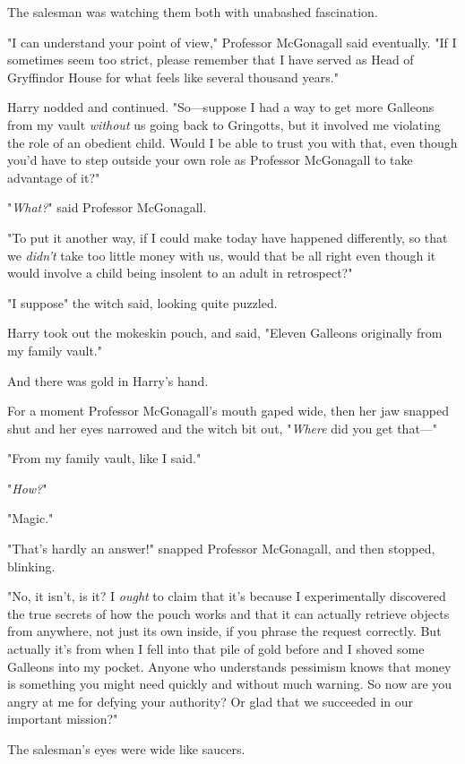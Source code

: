The salesman was watching them both with unabashed fascination.

"I can understand your point of view," Professor McGonagall said eventually.
"If I sometimes seem too strict, please remember that I have served as Head of
Gryffindor House for what feels like several thousand years."

Harry nodded and continued. "So—suppose I had a way to get more Galleons from
my vault \emph{without} us going back to Gringotts, but it involved me
violating the role of an obedient child. Would I be able to trust you with
that, even though you'd have to step outside your own role as Professor
McGonagall to take advantage of it?"

"\emph{What?}" said Professor McGonagall.

"To put it another way, if I could make today have happened differently, so
that we \emph{didn't} take too little money with us, would that be all right
even though it would involve a child being insolent to an adult in retrospect?"

"I{\el} suppose{\el}" the witch said, looking quite puzzled.

Harry took out the mokeskin pouch, and said, "Eleven Galleons originally from
my family vault."

And there was gold in Harry's hand.

For a moment Professor McGonagall's mouth gaped wide, then her jaw snapped shut
and her eyes narrowed and the witch bit out, "\emph{Where} did you get that—"

"From my family vault, like I said."

"\emph{How?}"

"Magic."

"That's hardly an answer!" snapped Professor McGonagall, and then stopped,
blinking.

"No, it isn't, is it? I \emph{ought} to claim that it's because I
experimentally discovered the true secrets of how the pouch works and that it
can actually retrieve objects from anywhere, not just its own inside, if you
phrase the request correctly. But actually it's from when I fell into that pile
of gold before and I shoved some Galleons into my pocket. Anyone who
understands pessimism knows that money is something you might need quickly and
without much warning. So now are you angry at me for defying your authority? Or
glad that we succeeded in our important mission?"

The salesman's eyes were wide like saucers.

